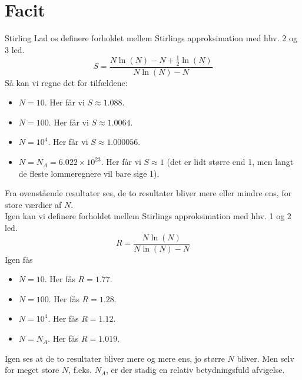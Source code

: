 \section{Facit}

\setcounter{opgave}{0}

\begin{opgave}{Stirling}
    Lad os definere forholdet mellem Stirlings approksimation med hhv. 2 og 3 led.
    \[ S=\frac{N\ln(N)-N+\frac{1}{2}\ln(N)}{N\ln(N)-N} \]
    Så kan vi regne det for tilfældene:
    \begin{itemize}
        \item $N=10$. Her får vi $S\approx 1.088$.
        \item $N=100$. Her får vi $S\approx 1.0064$.
        \item $N=10^4$. Her får vi $S\approx 1.000056$.
        \item $N=N_A=6.022\times 10^{23}$. Her får vi $S\approx 1$ (det er lidt større end 1, men langt de fleste lommeregnere vil bare sige 1).
    \end{itemize}
    Fra ovenstående resultater ses, de to resultater bliver mere eller mindre ens, for store værdier af $N$.\\
    Igen kan vi definere forholdet mellem Stirlings approksimation med hhv. 1 og 2 led.
    \[ R=\frac{N\ln(N)}{N\ln(N)-N} \]
    Igen fås
    \begin{itemize}
        \item $N=10$. Her fås $R=1.77$.
        \item $N=100$. Her fås $R=1.28$.
        \item $N=10^4$. Her fås $R=1.12$.
        \item $N=N_A$. Her fås $R=1.019$.
    \end{itemize}
    Igen ses at de to resultater bliver mere og mere ens, jo større $N$ bliver. Men selv for meget store $N$, f.eks. $N_A$, er der stadig en relativ betydningsfuld afvigelse.
\end{opgave}

